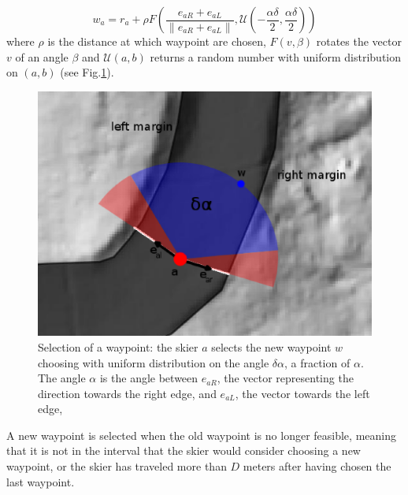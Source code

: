 \documentclass[12pt,a4paper,twoside]{book}
\newcommand{\norm}[1]{\lVert#1\rVert}
\begin{document}
\begin{equation}\label{new_waypoint}
w_a=r_a+\rho F\left(\frac{e_{aR}+e_{aL}}{\norm{e_{aR}+e_{aL}}},\mathcal{U}\left(-\frac{\alpha\delta}{2},\frac{\alpha\delta}{2}\right)\right)
\end{equation}
where $\rho$ is the distance at which waypoint are chosen, $F\left(v,\beta\right)$ rotates the vector $v$ of an angle $\beta$ and $\mathcal{U}(a,b)$ returns a random number with uniform distribution on $(a,b)$ (see Fig.\ref{new_waypoint_pic}).

\begin{figure}[!ht]
  \begin{center}
    \includegraphics[width=\textwidth]{images/waypoint_new.eps}
    \caption{Selection of a waypoint: the skier $a$ selects the new waypoint $w$ choosing with uniform distribution on the angle $\delta\alpha$, a fraction of $\alpha$. The angle $\alpha$ is the angle between $e_{aR}$, the vector representing the direction towards the right edge, and $e_{aL}$, the vector towards the left edge,}\label{new_waypoint_pic}
  \end{center}
\end{figure}

A new waypoint is selected when the old waypoint is no longer feasible, meaning that it is not in the interval that the skier would consider choosing a new waypoint,  or the skier has traveled more than $D$ meters after having chosen the last waypoint.
\end{document}
